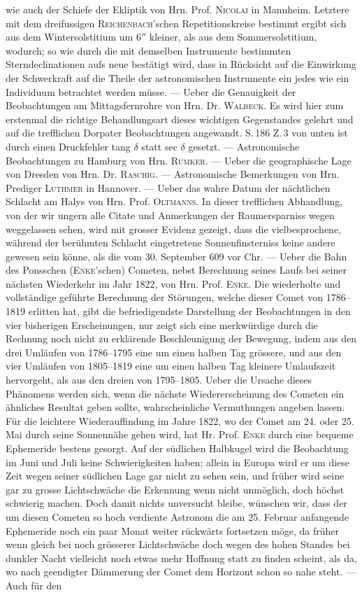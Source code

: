 wie auch der Schiefe der Ekliptik von Hrn. Prof. \textsc{Nicolai} in Mannheim. Letztere mit dem dreifussigen \textsc{Reichenbach}'schen Repetitionskreise bestimmt ergibt sich aus dem Wintersolstitium um $6''$ kleiner, als aus dem Sommersolstitium, wodurch; so wie durch die mit demselben Instrumente bestimmten Sterndeclinationen aufs neue bestätigt wird, dass in Rücksicht auf die Einwirkung der Schwerkraft auf die Theile der astronomischen Instrumente ein jedes wie ein Individuum betrachtet werden müsse. --- Ueber die Genauigkeit der Beobachtungen am Mittagsfernrohre von Hrn. Dr. \textsc{Walbeck}. Es wird hier zum erstenmal die richtige Behandlungsart dieses  wichtigen Gegenstandes gelehrt und auf die trefflichen Dorpater Beobachtungen angewandt. S.\,186 Z.\,3 von unten ist durch einen Druckfehler tang $\delta$ statt sec $\delta$ gesetzt. --- Astronomische Beobachtungen zu Hamburg von Hrn. \textsc{Rümker}. --- Ueber die geographische Lage von Dresden von Hrn. Dr. \textsc{Raschig}. --- Astronomische Bemerkungen von Hrn. Prediger \textsc{Luthmer} in Hannover. --- Ueber das wahre Datum der nächtlichen Schlacht am Halys von Hrn. Prof. \textsc{Oltmanns}. In dieser trefflichen Abhandlung, von der wir ungern alle Citate und Anmerkungen der Raumersparniss wegen weggelassen sehen, wird mit grosser Evidenz gezeigt, dass die vielbesprochene, während der berühmten Schlacht eingetretene Sonnenfinsterniss keine andere gewesen sein könne, als die vom 30. September 609 vor Chr. --- Ueber die Bahn des Ponsschen (\textsc{Enke}'schen) Cometen, nebst Berechnung seines Laufs bei seiner nächsten Wiederkehr im Jahr 1822, von Hrn. Prof. \textsc{Enke}. Die wiederholte und vollständige geführte Berechnung der Störungen, welche dieser Comet von 1786--1819 erlitten hat, gibt die befriedigendste Darstellung der Beobachtungen in den vier bisherigen Erscheinungen, nur zeigt sich eine merkwürdige durch die Rechnung noch nicht zu erklärende Beschleunigung der Bewegung, indem aus den drei Umläufen von 1786--1795 eine um einen halben Tag grössere, und aus den vier Umläufen von 1805--1819 eine um einen halben Tag kleinere Umlaufszeit hervorgeht, als aus den dreien von 1795--1805. Ueber die Ursache dieses Phänomens werden sich, wenn die nächste Wiedererscheinung des Cometen ein ähnliches Resultat geben sollte, wahrscheinliche Vermuthungen angeben lassen. Für die leichtere Wiederauffindung im Jahre 1822, wo der Comet am 24. oder 25. Mai durch seine Sonnennähe gehen wird, hat Hr. Prof. \textsc{Enke} durch eine bequeme Ephemeride bestens gesorgt. Auf der südlichen Halbkugel wird die Beobachtung im Juni und Juli keine Schwierigkeiten haben; allein in Europa wird er um diese Zeit wegen seiner südlichen Lage gar nicht zu sehen sein, und früher wird seine gar zu grosse Lichtschwäche die Erkennung wenn nicht unmöglich, doch höchst schwierig machen. Doch damit nichts unversucht bleibe, wünschen wir, dass der um diesen Cometen so hoch verdiente Astronom die am 25. Februar anfangende Ephemeride noch ein paar Monat weiter rückwärts fortsetzen möge, da früher wenn gleich bei noch grösserer Lichtschwäche doch wegen des hohen Standes bei dunkler Nacht vielleicht noch etwas mehr Hoffnung statt zu finden scheint, als da, wo nach geendigter Dämmerung der Comet dem Horizont schon so nahe steht. --- Auch für den 